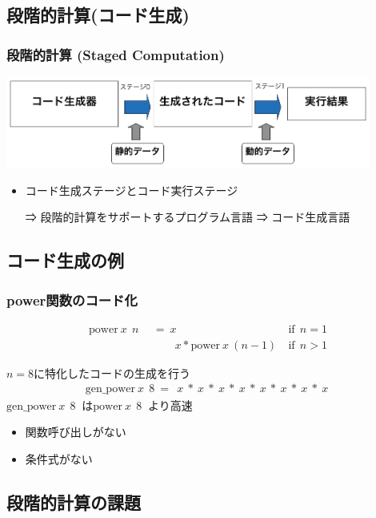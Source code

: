 \documentclass[dvipdfmx,cjk,xcolor=dvipsnames,envcountsect,notheorems,12pt]{beamer}
\theoremstyle{definition}
\begin{document}
\subsection{段階的計算(コード生成)}
\begin{frame}
  \frametitle{段階的計算 (Staged Computation)}
  \includegraphics[clip,width=12cm]{../img/prggen.png}
  \begin{itemize}
  \item コード生成ステージとコード実行ステージ
  \item[⇒] 段階的計算をサポートするプログラム言語 ⇒ コード生成言語
  \end{itemize}
\end{frame}

\subsection{コード生成の例}
\begin{frame}
  \frametitle{power関数のコード化}
  \begin{align*}
    \text{power} ~x~ ~n~ &~=~ x &\text{if} ~~n = 1 \\
                         &~~~\phantom{=}~ x * \text{power} ~x~ (n-1)~ &\text{if} ~~n > 1
  \end{align*}

  \pause
  $n = 8$に特化したコードの生成を行う
  \begin{align*}
    \text{gen\_power} ~x~ ~8~ =~ ~x~ * ~x~ * ~x~ * ~x~ * ~x~ * ~x~ * ~x~ * ~x~
  \end{align*}
  \pause
  $\text{gen\_power} ~x~ ~8~$ は$\text{power} ~x~ ~8~$ より高速
  \begin{itemize}
  \item 関数呼び出しがない
  \item 条件式がない
  \end{itemize}
\end{frame}

\subsection{段階的計算の課題}
\end{document}

